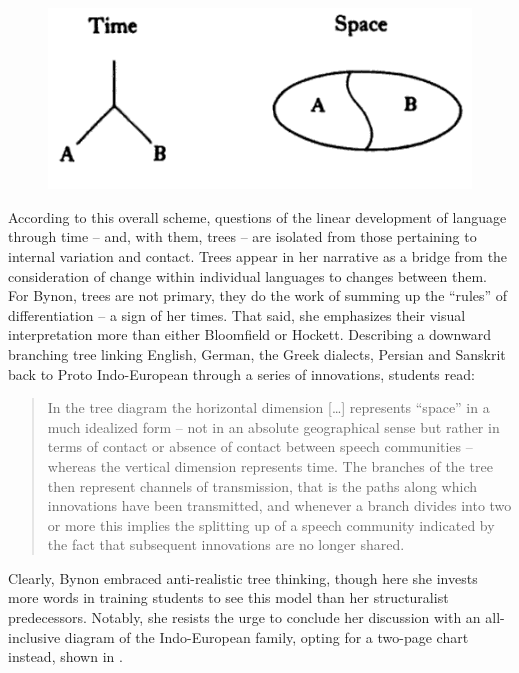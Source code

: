 \documentclass[output=paper]{langscibook}
\begin{document}
\begin{figure}
    \centering
    \includegraphics[scale=0.6]{figures/bynon1977-new.png}
    \caption{\citet[173]{Bynon1977}}
    \label{fig:kaplan:bynon1977}
\end{figure}

According to this overall scheme, questions of the linear development of language through time -- and, with them, trees -- are isolated from those pertaining to internal variation and contact. Trees appear in her narrative as a bridge from the consideration of change within individual languages to changes between them. For Bynon, trees are not primary, they do the work of summing up the ``rules'' of differentiation -- a sign of her times. That said, she emphasizes their visual interpretation more than either Bloomfield or Hockett. Describing a downward branching tree linking English, German, the Greek dialects, Persian and Sanskrit back to Proto Indo-European through a series of innovations, students read:

\begin{quotation}
In the tree diagram the horizontal dimension […] represents ``space'' in a much idealized form -- not in an absolute geographical sense but rather in terms of contact or absence of contact between speech communities -- whereas the vertical dimension represents time. The branches of the tree then represent channels of transmission, that is the paths along which innovations have been transmitted, and whenever a branch divides into two or more this implies the splitting up of a speech community indicated by the fact that subsequent innovations are no longer shared. \citep[66]{Bynon1977}
\end{quotation}

Clearly, Bynon embraced anti-realistic tree thinking, though here she invests more words in training students to see this model than her structuralist predecessors. Notably, she resists the urge to conclude her discussion with an all-inclusive diagram of the Indo-European family, opting for a two-page chart instead, shown in .
\end{document}
